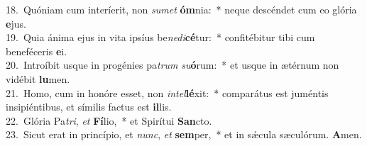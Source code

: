 {18.~}Quóniam cum interíerit, non \textit{su}\textit{met} \textbf{óm}nia:~* neque descéndet cum eo glória \textbf{e}jus.\\
{19.~}Quia ánima ejus in vita ipsíus be\textit{ne}\textit{di}\textbf{cé}tur:~* confitébitur tibi cum beneféceris \textbf{e}i.\\
{20.~}Introíbit usque in progénies pa\textit{trum} \textit{su}\textbf{ó}rum:~* et usque in ætérnum non vidébit \textbf{lu}men.\\
{21.~}Homo, cum in honóre esset, non \textit{in}\textit{tel}\textbf{lé}xit:~* comparátus est juméntis insipiéntibus, et símilis factus est \textbf{il}lis.\\
{22.~}Glória Pa\textit{tri}, \textit{et} \textbf{Fí}lio,~* et Spirítui \textbf{San}cto.\\
{23.~}Sicut erat in princípio, et \textit{nunc}, \textit{et} \textbf{sem}per,~* et in sǽcula sæculórum. \textbf{A}men.\\
